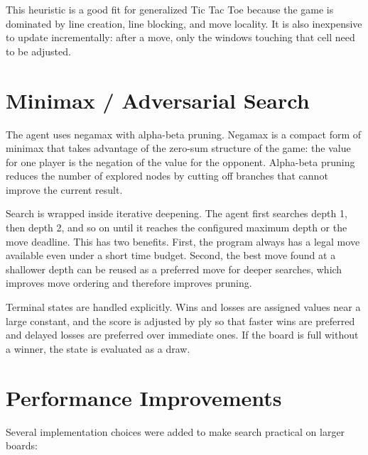 \documentclass[10pt]{article}
\begin{document}
This heuristic is a good fit for generalized Tic Tac Toe because the game is dominated by line creation, line blocking, and move locality. It is also inexpensive to update incrementally: after a move, only the windows touching that cell need to be adjusted.

\section*{Minimax / Adversarial Search}
The agent uses negamax with alpha-beta pruning. Negamax is a compact form of minimax that takes advantage of the zero-sum structure of the game: the value for one player is the negation of the value for the opponent. Alpha-beta pruning reduces the number of explored nodes by cutting off branches that cannot improve the current result.

Search is wrapped inside iterative deepening. The agent first searches depth 1, then depth 2, and so on until it reaches the configured maximum depth or the move deadline. This has two benefits. First, the program always has a legal move available even under a short time budget. Second, the best move found at a shallower depth can be reused as a preferred move for deeper searches, which improves move ordering and therefore improves pruning.

Terminal states are handled explicitly. Wins and losses are assigned values near a large constant, and the score is adjusted by ply so that faster wins are preferred and delayed losses are preferred over immediate ones. If the board is full without a winner, the state is evaluated as a draw.

\section*{Performance Improvements}
Several implementation choices were added to make search practical on larger boards:
\end{document}
